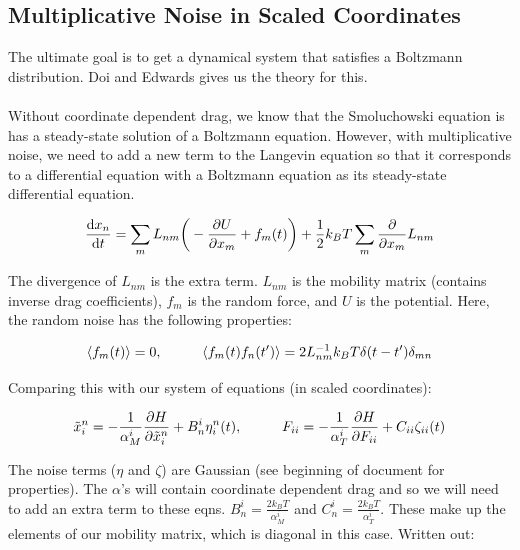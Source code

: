 \documentclass[12pt]{article}
\begin{document}
\subsection{Multiplicative Noise in Scaled Coordinates}
The ultimate goal is to get a dynamical system that satisfies a Boltzmann distribution. Doi and Edwards gives us the theory for this. \\ \\
Without coordinate dependent drag, we know that the Smoluchowski equation is has a steady-state solution of a Boltzmann equation. However, with multiplicative noise, we need to add a new term to the Langevin equation so that it corresponds to a differential equation with a Boltzmann equation as its steady-state differential equation. 
\begin{center}
\begin{equation}
\label{eqn: Langevin eqn with extra term}
\dv{x_n}{t} = \sum\limits_m L_{nm} \bigg(-\pdv{U}{x_m} + f_m(t)\bigg) + \frac{1}{2} k_B T \sum\limits_{m} \pdv{x_m} L_{nm}
\end{equation}
\end{center}
The divergence of $L_{nm}$ is the extra term. $L_{nm}$ is the mobility matrix (contains inverse drag coefficients), $f_m$ is the random force, and $U$ is the potential. Here, the random noise has the following properties:
\begin{center}
\begin{equation}
\expval{f_m(t)} = 0, \hspace{1cm} \expval{f_m(t) f_n(t')} = 2 L_{nm}^{-1} k_B T \delta(t-t') \delta_{mn}
\end{equation}
\end{center}
Comparing this with our system of equations (in scaled coordinates):
\begin{center}
\begin{equation}
\label{eqn: sysofeqns}
\tilde{x}_i^n = -\frac{1}{\alpha_M^{i}} \pdv{H}{\tilde{x}_i^n} + B_n^i \eta_i^n(t), \hspace{1cm} F_{ii} = -\frac{1}{\alpha_T^i} \pdv{H}{F_{ii}} + C_{ii} \zeta_{ii}(t)
\end{equation}
\end{center} 
The noise terms ($\eta$ and $\zeta$) are Gaussian (see beginning of document for properties). The $\alpha$'s will contain coordinate dependent drag and so we will need to add an extra term to these eqns. $B_n^i = \frac{2 k_B T}{\alpha_M^i}$ and $C_n^i = \frac{2 k_B T}{\alpha_T^i}$. These make up the elements of our mobility matrix, which is diagonal in this case. Written out:
\end{document}
